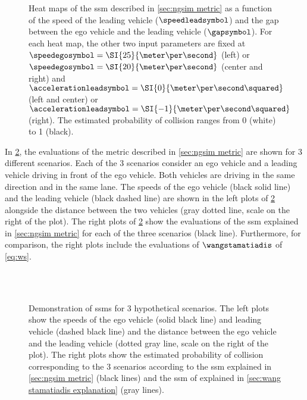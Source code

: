 \setlength{\figurewidth}{.35\linewidth}
\setlength{\figureheight}{0.8\figurewidth}
\begin{figure}
	\centering
	
	\caption{Heat maps of the \ac{ssm} described in \cref{sec:ngsim metric} as a function of the speed of the leading vehicle ($\speedleadsymbol$) and the gap between the ego vehicle and the leading vehicle ($\gapsymbol$).
		For each heat map, the other two input parameters are fixed at $\speedegosymbol=\SI{25}{\meter\per\second}$ (left) or $\speedegosymbol=\SI{20}{\meter\per\second}$ (center and right) and $\accelerationleadsymbol=\SI{0}{\meter\per\second\squared}$ (left and center) or $\accelerationleadsymbol=\SI{-1}{\meter\per\second\squared}$ (right).
		The estimated probability of collision ranges from 0 (white) to 1 (black).}
	\label{fig:heatmaps}
\end{figure}

In \cref{fig:scenarios}, the evaluations of the metric described in \cref{sec:ngsim metric} are shown for 3 different scenarios. 
Each of the 3 scenarios consider an ego vehicle and a leading vehicle driving in front of the ego vehicle.
Both vehicles are driving in the same direction and in the same lane. 
The speeds of the ego vehicle (black solid line) and the leading vehicle (black dashed line) are shown in the left plots of \cref{fig:scenarios} alongside the distance between the two vehicles (gray dotted line, scale on the right of the plot).
The right plots of \cref{fig:scenarios} show the evaluations of the \ac{ssm} explained in \cref{sec:ngsim metric} for each of the three scenarios (black line).
Furthermore, for comparison, the right plots include the evaluations of $\wangstamatiadis$ of \cref{eq:ws}.

\setlength{\figurewidth}{.45\linewidth}
\setlength{\figureheight}{0.6\figurewidth}
\begin{figure}
	\centering
	
	\\
	
	\\
	
	
	\caption{Demonstration of \acp{ssm} for 3 hypothetical scenarios. 
		The left plots show the speeds of the ego vehicle (solid black line) and leading vehicle (dashed black line) and the distance between the ego vehicle and the leading vehicle (dotted gray line, scale on the right of the plot).
		The right plots show the estimated probability of collision corresponding to the 3 scenarios according to the \ac{ssm} explained in \cref{sec:ngsim metric} (black lines) and the \ac{ssm} of \textcite{wang2014evaluation} explained in \cref{sec:wang stamatiadis explanation} (gray lines).}
	\label{fig:scenarios}		
\end{figure}

